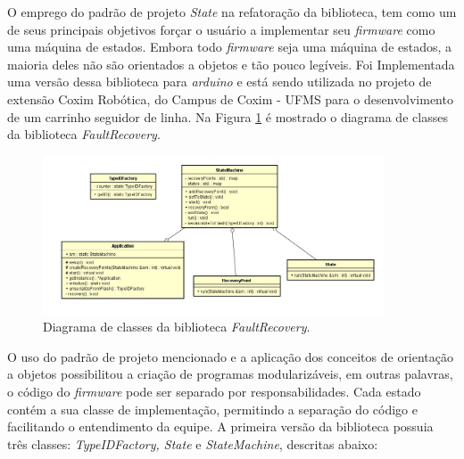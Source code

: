O emprego do padrão de projeto \textit{State} na refatoração da biblioteca, tem como um de seus principais objetivos forçar o usuário a implementar seu \textit{firmware} como uma máquina de estados. Embora todo \textit{firmware} seja uma máquina de estados, a maioria deles não são orientados a objetos e tão pouco legíveis. Foi Implementada uma versão dessa biblioteca para \textit{arduino} e está sendo utilizada no projeto de extensão Coxim Robótica, do Campus de Coxim - UFMS para o desenvolvimento de um carrinho seguidor de linha. Na Figura \ref{Img:diagramaFaultRecovery} é mostrado o diagrama de classes da biblioteca \textit{FaultRecovery}.

\begin{figure}[H]
	\centering
	\includegraphics[width=0.9\textwidth]{figuras/diagramaFaultRecovery.jpg}
	\caption[Diagrama de classes da biblioteca \textit{FaultRecovery}.]{Diagrama de classes da biblioteca \textit{FaultRecovery}.}
	\label{Img:diagramaFaultRecovery}	
\end{figure}

O uso do padrão de projeto mencionado e a aplicação dos conceitos de orientação a objetos possibilitou a criação de programas modularizáveis, em outras palavras, o código do \textit{firmware} pode ser separado por responsabilidades. Cada estado contém a sua classe de implementação, permitindo a separação do código e facilitando o entendimento da equipe. A primeira versão da biblioteca possuia três classes: \textit{TypeIDFactory, State} e \textit{StateMachine}, descritas abaixo:

